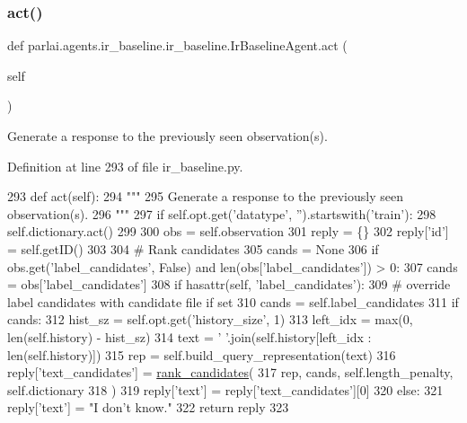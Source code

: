 \subsubsection{\texorpdfstring{act()}{act()}}
{\footnotesize\ttfamily def parlai.\+agents.\+ir\+\_\+baseline.\+ir\+\_\+baseline.\+Ir\+Baseline\+Agent.\+act (\begin{DoxyParamCaption}\item[{}]{self }\end{DoxyParamCaption})}

\begin{DoxyVerb}Generate a response to the previously seen observation(s).
\end{DoxyVerb}
 

Definition at line 293 of file ir\+\_\+baseline.\+py.


\begin{DoxyCode}
293     \textcolor{keyword}{def }act(self):
294         \textcolor{stringliteral}{"""}
295 \textcolor{stringliteral}{        Generate a response to the previously seen observation(s).}
296 \textcolor{stringliteral}{        """}
297         \textcolor{keywordflow}{if} self.opt.get(\textcolor{stringliteral}{'datatype'}, \textcolor{stringliteral}{''}).startswith(\textcolor{stringliteral}{'train'}):
298             self.dictionary.act()
299 
300         obs = self.observation
301         reply = \{\}
302         reply[\textcolor{stringliteral}{'id'}] = self.getID()
303 
304         \textcolor{comment}{# Rank candidates}
305         cands = \textcolor{keywordtype}{None}
306         \textcolor{keywordflow}{if} obs.get(\textcolor{stringliteral}{'label\_candidates'}, \textcolor{keyword}{False}) \textcolor{keywordflow}{and} len(obs[\textcolor{stringliteral}{'label\_candidates'}]) > 0:
307             cands = obs[\textcolor{stringliteral}{'label\_candidates'}]
308         \textcolor{keywordflow}{if} hasattr(self, \textcolor{stringliteral}{'label\_candidates'}):
309             \textcolor{comment}{# override label candidates with candidate file if set}
310             cands = self.label\_candidates
311         \textcolor{keywordflow}{if} cands:
312             hist\_sz = self.opt.get(\textcolor{stringliteral}{'history\_size'}, 1)
313             left\_idx = max(0, len(self.history) - hist\_sz)
314             text = \textcolor{stringliteral}{' '}.join(self.history[left\_idx : len(self.history)])
315             rep = self.build\_query\_representation(text)
316             reply[\textcolor{stringliteral}{'text\_candidates'}] = \hyperlink{namespaceparlai_1_1agents_1_1ir__baseline_1_1ir__baseline_a995475fdd96a7bbd8886a3ebcfa56156}{rank\_candidates}(
317                 rep, cands, self.length\_penalty, self.dictionary
318             )
319             reply[\textcolor{stringliteral}{'text'}] = reply[\textcolor{stringliteral}{'text\_candidates'}][0]
320         \textcolor{keywordflow}{else}:
321             reply[\textcolor{stringliteral}{'text'}] = \textcolor{stringliteral}{"I don't know."}
322         \textcolor{keywordflow}{return} reply
323 
\end{DoxyCode}
